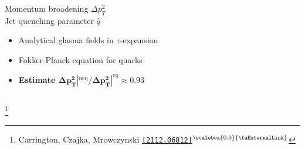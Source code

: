 \documentclass[aspectratio=169,11pt,usenames,dvipsnames]{beamer}
\renewcommand{\thefootnote}{\color{customblue}\faPaperPlaneO}
\newcommand\blfootnote[1]{%
  \begingroup
  \renewcommand\thefootnote{}\footnote{#1}%
  \addtocounter{footnote}{-1}%
  \endgroup
}
\begin{document}
\begin{frame}[t,noframenumbering]
\begin{columns}[onlytextwidth,t]
\begin{center}
            {\Large\color{isgold} Momentum broadening $\Delta p_T^2$ \\[5pt] Jet quenching parameter $\hat{q}$  \\[10pt]}
            \footnotesize
                \begin{itemize}
                    \item {\color{lightgray}Analytical glasma fields in $\tau$-expansion}
                    \item {\color{lightgray} Fokker-Planck equation for quarks}
                    \\[15pt]
                    \item {\color{destacado}\bfseries\normalsize Estimate $\boldsymbol{\Delta p_T^2|^\mathrm{neq}/\Delta p_T^2|^\mathrm{eq}\approx 0.93}$}
                \end{itemize}
        \end{center}
    \end{columns}
    \blfootnote{\scriptsize Carrington, Czajka, Mrowczynski \href{https://arxiv.org/abs/2112.06812}{\color{palgold}\texttt{[2112.06812]}$^\text{\scalebox{0.9}{\faExternalLink}}$}}
\end{frame}
   
\end{document}

